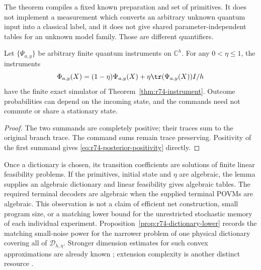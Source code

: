 The theorem compiles a fixed known preparation and set of primitives. It
does not implement a measurement which converts an arbitrary unknown quantum
input into a classical label, and it does not give shared parameter-independent
tables for an unknown model family. Those are different quantifiers.

\begin{corollary}
\label{cor:r74-noisy-instruments}
Let $\{\Psi_{a,y}\}$ be arbitrary finite quantum instruments on
$\mathbb C^h$. For any $0<\eta\le1$, the instruments
\begin{equation}\label{eq:r74-branch-noise}
 \Phi_{a,y}(X)=(1-\eta)\Psi_{a,y}(X)
            +\eta\tr(\Psi_{a,y}(X))I/h
\end{equation}
have the finite exact simulator of Theorem~\ref{thm:r74-instrument}.
Outcome probabilities can depend on the incoming state, and the commands
need not commute or share a stationary state.
\end{corollary}
\begin{proof}
The two summands are completely positive; their traces sum to the original
branch trace. The command sums remain trace preserving. Positivity of the
first summand gives \eqref{eq:r74-posterior-positivity} directly.
\end{proof}

Once a dictionary is chosen, its transition coefficients are solutions of
finite linear feasibility problems. If the primitives, initial state and
$\eta$ are algebraic, the lemma supplies an algebraic dictionary and
linear feasibility gives algebraic tables. The required terminal decoders
are algebraic when the supplied terminal POVMs are algebraic. This observation is not a claim
of efficient net construction, small program size, or a matching lower bound
for the unrestricted stochastic memory of each individual experiment.
Proposition~\ref{prop:r74-dictionary-lower} records the matching small-noise
power for the narrower problem of one physical dictionary covering all of
$\mathcal D_{h,\eta}$. Stronger dimension estimates for such convex
approximations are already known \cite{AubrunSzarek17}; extension complexity
is another distinct resource \cite{Fawzi21}.
